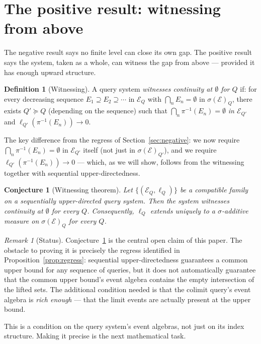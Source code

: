 \documentclass[12pt]{article}
\newtheorem{conjecture}[theorem]{Conjecture}
\theoremstyle{definition}
\newtheorem{definition}[theorem]{Definition}
\theoremstyle{remark}
\newtheorem{remark}[theorem]{Remark}
\newcommand{\E}{\mathcal{E}}
\newcommand{\sigE}{\sigma(\mathcal{E})}
\begin{document}
\section{The positive result: witnessing from above}
\label{sec:positive}

The negative result says no finite level can close its own gap.  The positive result
says the system, taken as a whole, can witness the gap from above --- provided it has
enough upward structure.

\begin{definition}[Witnessing]
\label{def:witnessing}
A query system \emph{witnesses continuity at $\emptyset$ for $Q$} if: for every
decreasing sequence $E_1 \supseteq E_2 \supseteq \cdots$ in $\E_Q$ with
$\bigcap_n E_n = \emptyset$ in $\sigE_Q$, there exists $Q' \succeq Q$ (depending
on the sequence) such that $\bigcap_n \pi^{-1}(E_n) = \emptyset$ \emph{in $\E_{Q'}$}
and $\ell_{Q'}(\pi^{-1}(E_n)) \to 0$.
\end{definition}

\noindent The key difference from the regress of Section~\ref{sec:negative}: we now
require $\bigcap_n \pi^{-1}(E_n) = \emptyset$ in $\E_{Q'}$ itself (not just in
$\sigE_{Q'}$), and we require $\ell_{Q'}(\pi^{-1}(E_n)) \to 0$ --- which, as we will
show, follows from the witnessing together with sequential upper-directedness.

\begin{conjecture}[Witnessing theorem]
\label{conj:witnessing}
Let $\{(\E_Q, \ell_Q)\}$ be a compatible family on a sequentially upper-directed
query system.  Then the system witnesses continuity at $\emptyset$ for every $Q$.
Consequently, $\ell_Q$ extends uniquely to a $\sigma$-additive measure on $\sigE_Q$
for every $Q$.
\end{conjecture}

\begin{remark}[Status]
Conjecture~\ref{conj:witnessing} is the central open claim of this paper.  The
obstacle to proving it is precisely the regress identified in
Proposition~\ref{prop:regress}: sequential upper-directedness guarantees a common
upper bound for any sequence of queries, but it does not automatically guarantee
that the common upper bound's event algebra contains the empty intersection of the
lifted sets.  The additional condition needed is that the colimit query's event algebra
is \emph{rich enough} --- that the limit events are actually present at the upper bound.

This is a condition on the query system's event algebras, not just on its index
structure.  Making it precise is the next mathematical task.
\end{remark}
\end{document}
